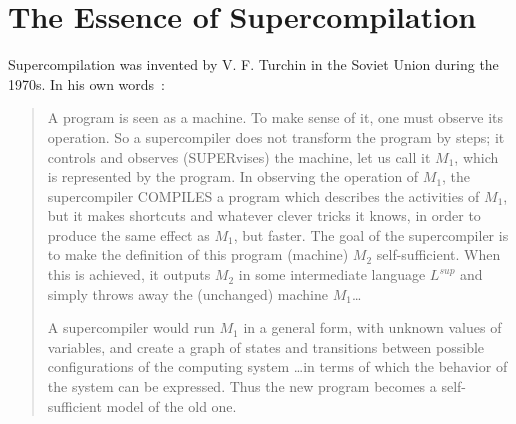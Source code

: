 \section{The Essence of Supercompilation}
\label{sec:idea}

Supercompilation was invented by V. F. Turchin in the Soviet Union during the 1970s.
In his own words~\cite{Turchin1986Supercompiler}:
\begin{quote}
A program is seen as a machine.
To make sense of it, one must observe its operation. So a supercompiler does not transform the
program by steps; it controls and observes (SUPERvises) the machine, let us call it $M_1$, which is
represented by the program. In observing the operation of $M_1$, the supercompiler COMPILES a
program which describes the activities of $M_1$, but it makes shortcuts and whatever clever tricks
it knows, in order to produce the same effect as $M_1$, but faster. The goal of the supercompiler is
to make the definition of this program (machine) $M_2$ self-sufficient. When this is achieved, it
outputs $M_2$ in some intermediate language $L^{sup}$ and simply throws away the (unchanged) machine $M_1$\ldots

A supercompiler would run $M_1$ in a general
form, with unknown values of variables, and create a graph of states and transitions between
possible configurations of the computing system \ldots in terms of which the behavior of the system
can be expressed. Thus the new program becomes a self-sufficient model of the old one.
\end{quote}


